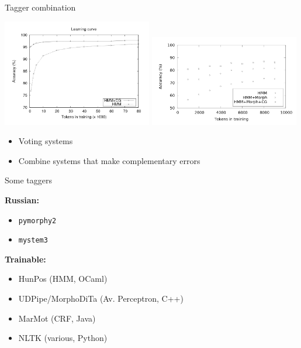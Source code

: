 \documentclass{beamer}
\begin{document}

\begin{frame}{Tagger combination}


\includegraphics[width=0.49\textwidth]{images/mans-huldren-tagger-chart.png}
\includegraphics[width=0.49\textwidth]{images/fran-rob-tagger-graph.png}

\begin{itemize}
  \item Voting systems 
  \item Combine systems that make complementary errors
\end{itemize}

\end{frame}


\begin{frame}{Some taggers}


\textbf{Russian:}
\begin{itemize}
  \item {\tt pymorphy2}
  \item {\tt mystem3}
\end{itemize}

\textbf{Trainable:}
\begin{itemize}
  \item HunPos (HMM, OCaml)
  \item UDPipe/MorphoDiTa (Av. Perceptron, C++)
  \item MarMot (CRF, Java)
  \item NLTK (various, Python)
\end{itemize}


\end{frame}
\end{document}
